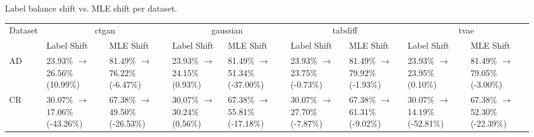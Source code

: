 \begin{tinytable}
\centering
\caption{Label balance shift vs. MLE shift per dataset.}
\label{tab:label_balance_vs_mle_shift}
\begin{tabular}{lllllllll}
\toprule
Dataset & \multicolumn{2}{c}{ctgan} & \multicolumn{2}{c}{gaussian} & \multicolumn{2}{c}{tabdiff} & \multicolumn{2}{c}{tvae} \\
 & Label Shift & MLE Shift & Label Shift & MLE Shift & Label Shift & MLE Shift & Label Shift & MLE Shift \\
\midrule
AD & 23.93\% $\rightarrow$ 26.56\% (10.99\%) & 81.49\% $\rightarrow$ 76.22\% (-6.47\%) & 23.93\% $\rightarrow$ 24.15\% (0.93\%) & 81.49\% $\rightarrow$ 51.34\% (-37.00\%) & 23.93\% $\rightarrow$ 23.75\% (-0.73\%) & 81.49\% $\rightarrow$ 79.92\% (-1.93\%) & 23.93\% $\rightarrow$ 23.95\% (0.10\%) & 81.49\% $\rightarrow$ 79.05\% (-3.00\%) \\
CR & 30.07\% $\rightarrow$ 17.06\% (-43.26\%) & 67.38\% $\rightarrow$ 49.50\% (-26.53\%) & 30.07\% $\rightarrow$ 30.24\% (0.56\%) & 67.38\% $\rightarrow$ 55.81\% (-17.18\%) & 30.07\% $\rightarrow$ 27.70\% (-7.87\%) & 67.38\% $\rightarrow$ 61.31\% (-9.02\%) & 30.07\% $\rightarrow$ 14.19\% (-52.81\%) & 67.38\% $\rightarrow$ 52.30\% (-22.39\%) \\
\bottomrule
\end{tabular}
\end{tinytable}
